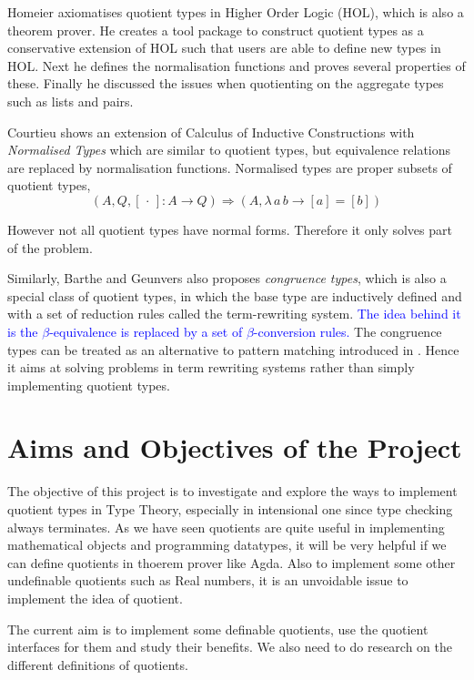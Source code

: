 \documentclass[envcountsame]{llncs}
\newcommand{\ed}[1]{\textcolor{blue}{#1}}
\newcommand{\dotph}{\,\cdot\,}
\providecommand{\class}[1]{[#1]}
\begin{document}
Homeier \cite{hom} axiomatises quotient types in Higher Order Logic
(HOL), which is also a theorem prover. He creates a tool package to
construct quotient types as a conservative extension of HOL such that
users are able to define new types in HOL. Next he defines the
normalisation functions and proves several properties of
these. Finally he discussed the issues when quotienting on the
aggregate types such as lists and pairs.


Courtieu \cite{cou:01} shows an extension of Calculus of Inductive Constructions
with \emph{Normalised Types} which are similar to quotient types, but equivalence relations are replaced by normalisation functions. Normalised types are proper subsets of quotient types,
\[ (A, Q, \class\dotph \colon A \to Q) \Rightarrow(A, \lambda \,a \,b\to \class a = \class b)\]

However not all quotient types have normal forms. Therefore it only solves part of the problem.

Similarly, Barthe and Geunvers \cite{bar:96} also proposes \emph{congruence types}, which is also a special class of quotient types, in which the base type are inductively defined and with a set of reduction rules called the term-rewriting system. \ed{The idea behind it is the $\beta$-equivalence is replaced by a set of $\beta$-conversion rules.} The congruence types can be treated as an alternative to pattern matching introduced in \cite{coq:92}.
Hence it aims at solving problems in term rewriting systems rather than simply implementing quotient types.


\section{Aims and Objectives of the Project}

The objective of this project is to investigate and explore the ways to
implement quotient types in Type Theory, especially in intensional
one since type checking always terminates.
As we have seen quotients are quite useful in implementing
mathematical objects and programming datatypes, it will be very
helpful if we can define quotients in thoerem prover like Agda. Also
to implement some other undefinable quotients such as Real numbers, it
is an unvoidable issue to implement the idea of quotient.

The current aim is to implement some definable quotients, use the
quotient interfaces for them and study their benefits. We also need to do
research on the different definitions of quotients.
\end{document}
